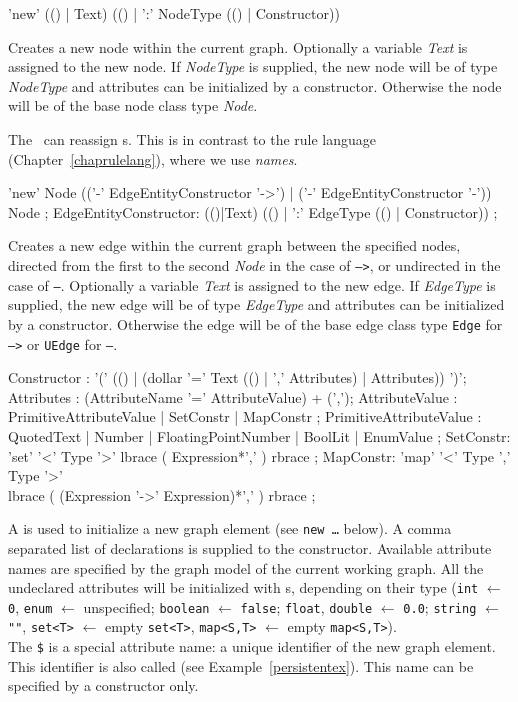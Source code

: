 \begin{rail}
  'new' (() | Text) (() | ':' NodeType (() | Constructor))
\end{rail}
Creates a new node within the current graph.
Optionally a variable \emph{Text} is assigned to the new node.
If \emph{NodeType} is supplied, the new node will be of type \emph{NodeType} and attributes can be initialized by a constructor.
Otherwise the node will be of the base node class type \emph{Node}.
\begin{note}
The \GrShell\ can reassign s. 
This is in contrast to the rule language (Chapter~\ref{chaprulelang}), where we use \emph{names}.
\end{note}

\begin{rail}
  'new' Node (('-' EdgeEntityConstructor '->') | ('-' EdgeEntityConstructor '-')) Node ;
EdgeEntityConstructor:
  (()|Text) (() | ':' EdgeType (() | Constructor)) ;
\end{rail}
Creates a new edge within the current graph between the specified nodes,
directed from the first to the second \emph{Node} in the case of \texttt{-->},
or undirected in the case of \texttt{--}.
Optionally a variable \emph{Text} is assigned to the new edge.
If \emph{EdgeType} is supplied, the new edge will be of type \emph{EdgeType} and attributes can be initialized by a constructor.
Otherwise the edge will be of the base edge class type \texttt{Edge} for \texttt{-->} or \texttt{UEdge} for \texttt{--}.

\begin{rail}
  Constructor : '(' (() | (dollar '=' Text (() | ',' Attributes) | Attributes)) ')';
  Attributes : (AttributeName '=' AttributeValue) + (',');
  AttributeValue :  PrimitiveAttributeValue | SetConstr | MapConstr ;
  PrimitiveAttributeValue : QuotedText | Number | FloatingPointNumber | BoolLit | EnumValue ;
  SetConstr: 'set' '<' Type '>' lbrace ( Expression*',' ) rbrace ;
  MapConstr: 'map' '<' Type ',' Type '>' \\ lbrace ( (Expression '->' Expression)*',' ) rbrace ;
\end{rail}\indexmain{\texttt{\$}}
A  is used to initialize a new graph element (see \texttt{new \dots} below).
A comma separated list of  declarations is supplied to the constructor.
Available attribute names are specified by the graph model of the current working graph.
All the undeclared attributes will be initialized with s, depending on their type 
(\texttt{int} $\leftarrow$ \texttt{0}, \texttt{enum} $\leftarrow$ unspecified; \texttt{boolean} $\leftarrow$ \texttt{false}; \texttt{float}, \texttt{double} $\leftarrow$ \texttt{0.0}; \texttt{string} $\leftarrow$ \texttt{""}, \texttt{set<T>} $\leftarrow$ empty \texttt{set<T>}, \texttt{map<S,T>} $\leftarrow$ empty \texttt{map<S,T>}).\\
The \texttt{\$} is a special attribute name: a unique identifier of the new graph element.
This identifier is also called  (see Example~\ref{persistentex}).
This name can be specified by a constructor only.

